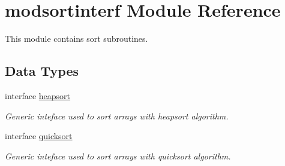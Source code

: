 \hypertarget{classmodsortinterf}{\section{modsortinterf Module Reference}
\label{classmodsortinterf}
}


This module contains sort subroutines.  


\subsection*{Data Types}
\begin{DoxyCompactItemize}
\item 
interface \hyperlink{interfacemodsortinterf_1_1heapsort}{heapsort}
\begin{DoxyCompactList}\small\item\em Generic inteface used to sort arrays with heapsort algorithm. \end{DoxyCompactList}\item 
interface \hyperlink{interfacemodsortinterf_1_1quicksort}{quicksort}
\begin{DoxyCompactList}\small\item\em Generic inteface used to sort arrays with quicksort algorithm. \end{DoxyCompactList}\end{DoxyCompactItemize}
